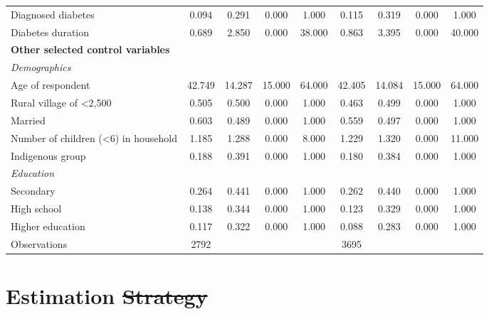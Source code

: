 \documentclass[12pt,english,british]{article}
\providecommand{\DIFaddtex}[1]{{\protect\color{blue}\uwave{#1}}} %
\providecommand{\DIFdeltex}[1]{{\protect\color{red}\sout{#1}}}                      %
\providecommand{\DIFaddbegin}{} %
\providecommand{\DIFaddend}{} %
\providecommand{\DIFdelbegin}{} %
\providecommand{\DIFdelend}{} %
\providecommand{\DIFadd}[1]{\texorpdfstring{\DIFaddtex{#1}}{#1}} %
\providecommand{\DIFdel}[1]{\texorpdfstring{\DIFdeltex{#1}}{}} %
\begin{document}
\begin{table}[h!]
\begin{center}
\begin{adjustbox}{max width=\textwidth}
{\begin{tabular}{l*{2}{cccc}}
Diagnosed diabetes  &       0.094&       0.291&       0.000&       1.000&       0.115&       0.319&       0.000&       1.000\\
Diabetes duration   &       0.689&       2.850&       0.000&      38.000&       0.863&       3.395&       0.000&      40.000\\
\textbf{Other selected control variables} &&&&&&&& \\
\hspace*{10mm}\emph{Demographics}&&&&&&&& \\
Age of respondent   &      42.749&      14.287&      15.000&      64.000&      42.405&      14.084&      15.000&      64.000\\
Rural village of <2,500&       0.505&       0.500&       0.000&       1.000&       0.463&       0.499&       0.000&       1.000\\
Married             &       0.603&       0.489&       0.000&       1.000&       0.559&       0.497&       0.000&       1.000\\
Number of children (<6) in household&       1.185&       1.288&       0.000&       8.000&       1.229&       1.320&       0.000&      11.000\\
Indigenous group    &       0.188&       0.391&       0.000&       1.000&       0.180&       0.384&       0.000&       1.000\\
\hspace*{10mm}\emph{Education}&&&&&&&& \\
Secondary           &       0.264&       0.441&       0.000&       1.000&       0.262&       0.440&       0.000&       1.000\\
High school         &       0.138&       0.344&       0.000&       1.000&       0.123&       0.329&       0.000&       1.000\\
Higher education    &       0.117&       0.322&       0.000&       1.000&       0.088&       0.283&       0.000&       1.000\\
\midrule
Observations        &        2792&            &            &            &        3695&            &            &            \\
\bottomrule
\end{tabular}%
}
\end{adjustbox}
\end{center}
\end{table}  



\section{\label{sec:Estimation Strategy}Estimation \DIFdelbegin \DIFdel{Strategy}\DIFdelend \DIFaddbegin \DIFadd{strategy}\DIFaddend }
\end{document}
